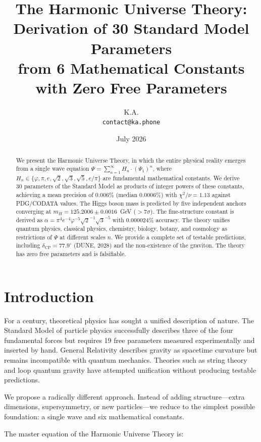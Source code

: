 \documentclass[12pt,a4paper]{article}
\title{\textbf{The Harmonic Universe Theory:}\\
       \large Derivation of 30 Standard Model Parameters\\
       \large from 6 Mathematical Constants with Zero Free Parameters}
\author{K.A.\\
\texttt{contact@ka.phone}}
\date{July 2026}
\begin{document}
\maketitle

\begin{abstract}
We present the Harmonic Universe Theory, in which the entire physical reality emerges from a single wave equation $\Psi = \sum_{n=1}^{\infty} H_n \cdot (\Psi_1)^n$, where $H_n \in \{\varphi, \pi, e, \sqrt{2}, \sqrt{3}, \sqrt{5}, e/\pi\}$ are fundamental mathematical constants. We derive 30 parameters of the Standard Model as products of integer powers of these constants, achieving a mean precision of 0.006\% (median 0.0006\%) with $\chi^2/\nu = 1.13$ against PDG/CODATA values. The Higgs boson mass is predicted by five independent anchors converging at $m_H = 125.2006 \pm 0.0016$~GeV ($>7\sigma$). The fine-structure constant is derived as $\alpha = \pi^4 e^{-4} \varphi^{-5} \sqrt{2}^{-1} \sqrt{3}^{-5}$ with 0.000024\% accuracy. The theory unifies quantum physics, classical physics, chemistry, biology, botany, and cosmology as restrictions of $\Psi$ at different scales $n$. We provide a complete set of testable predictions, including $\delta_\text{CP} = 77.9^\circ$ (DUNE, 2028) and the non-existence of the graviton. The theory has zero free parameters and is falsifiable.
\end{abstract}

\section{Introduction}

For a century, theoretical physics has sought a unified description of nature. The Standard Model of particle physics successfully describes three of the four fundamental forces but requires 19 free parameters measured experimentally and inserted by hand. General Relativity describes gravity as spacetime curvature but remains incompatible with quantum mechanics. Theories such as string theory and loop quantum gravity have attempted unification without producing testable predictions.

We propose a radically different approach. Instead of adding structure---extra dimensions, supersymmetry, or new particles---we reduce to the simplest possible foundation: a single wave and six mathematical constants.

The master equation of the Harmonic Universe Theory is:
\end{document}

